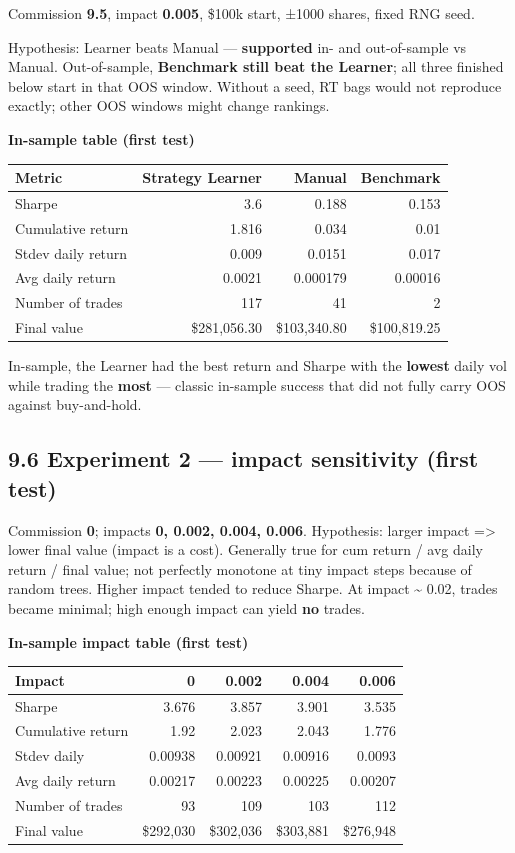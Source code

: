 \documentclass[
  11pt,
]{article}
\begin{document}
Commission \textbf{9.5}, impact \textbf{0.005}, \$100k start, ±1000
shares, fixed RNG seed.

Hypothesis: Learner beats Manual --- \textbf{supported} in- and
out-of-sample vs Manual. Out-of-sample, \textbf{Benchmark still beat the
Learner}; all three finished below start in that OOS window. Without a
seed, RT bags would not reproduce exactly; other OOS windows might
change rankings.

\textbf{In-sample table (first test)}

\begin{longtable}[]{@{}lrrr@{}}
\toprule\noalign{}
Metric & Strategy Learner & Manual & Benchmark \\
\midrule\noalign{}
\endhead
\bottomrule\noalign{}
\endlastfoot
Sharpe & 3.6 & 0.188 & 0.153 \\
Cumulative return & 1.816 & 0.034 & 0.01 \\
Stdev daily return & 0.009 & 0.0151 & 0.017 \\
Avg daily return & 0.0021 & 0.000179 & 0.00016 \\
Number of trades & 117 & 41 & 2 \\
Final value & \$281,056.30 & \$103,340.80 & \$100,819.25 \\
\end{longtable}

In-sample, the Learner had the best return and Sharpe with the
\textbf{lowest} daily vol while trading the \textbf{most} --- classic
in-sample success that did not fully carry OOS against buy-and-hold.

\subsection{9.6 Experiment 2 --- impact sensitivity (first
test)}\label{experiment-2-impact-sensitivity-first-test}

Commission \textbf{0}; impacts \textbf{0, 0.002, 0.004, 0.006}.
Hypothesis: larger impact =\textgreater{} lower final value (impact is a
cost). Generally true for cum return / avg daily return / final value;
not perfectly monotone at tiny impact steps because of random trees.
Higher impact tended to reduce Sharpe. At impact \textasciitilde{} 0.02,
trades became minimal; high enough impact can yield \textbf{no} trades.

\textbf{In-sample impact table (first test)}

\begin{longtable}[]{@{}lrrrr@{}}
\toprule\noalign{}
Impact & 0 & 0.002 & 0.004 & 0.006 \\
\midrule\noalign{}
\endhead
\bottomrule\noalign{}
\endlastfoot
Sharpe & 3.676 & 3.857 & 3.901 & 3.535 \\
Cumulative return & 1.92 & 2.023 & 2.043 & 1.776 \\
Stdev daily & 0.00938 & 0.00921 & 0.00916 & 0.0093 \\
Avg daily return & 0.00217 & 0.00223 & 0.00225 & 0.00207 \\
Number of trades & 93 & 109 & 103 & 112 \\
Final value & \$292,030 & \$302,036 & \$303,881 & \$276,948 \\
\end{longtable}
\end{document}
